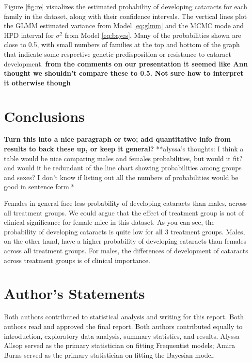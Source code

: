 \documentclass[12pt]{article}
\begin{document}
Figure \ref{fig:re} visualizes the estimated probability of developing cataracts for each family in the dataset, along with their confidence intervals. The vertical lines plot the GLMM estimated variance from Model \eqref{eq:glmm} and the MCMC mode and HPD interval for \(\sigma^2\) from Model \eqref{eq:bayes}. Many of the probabilities shown are close to 0.5, with small numbers of families at the top and bottom of the graph that indicate some respective genetic predisposition or resistance to cataract development. \textbf{from the comments on our presentation it seemed like Ann thought we shouldn't compare these to 0.5. Not sure how to interpret it otherwise though}

\section{Conclusions}
\label{sec:conc}

\textbf{Turn this into a nice paragraph or two; add quantitative info from results to back these up, or keep it general?}
**alyssa's thoughts: I think a table would be nice comparing males and females probabilities, but would it fit? and would it be redundant of the line chart showing probabilities among groups and sexes? I don't know if listing out all the numbers of probabilities would be good in sentence form.*

Females in general face less probability of developing cataracts than males, across all treatment groups. We could argue that the effect of treatment group is not of clinical significance for female mice in this dataset. As you can see, the probability of developing cataracts is quite low for all 3 treatment groups. Males, on the other hand, have a higher probability of developing cataracts than females across all treatment groups. For males, the differences of development of cataracts across treatment groups is of clinical importance.

\section{Author's Statements}
\label{sec:auth}

Both authors contributed to statistical analysis and writing for this report. Both authors read and approved the final report. Both authors contributed equally to introduction, exploratory data analysis, summary statistics, and results. Alyssa Allsop served as the primary statistician on fitting Frequentist models; Amira Burns served as the primary statistician on fitting the Bayesian model.
\end{document}
